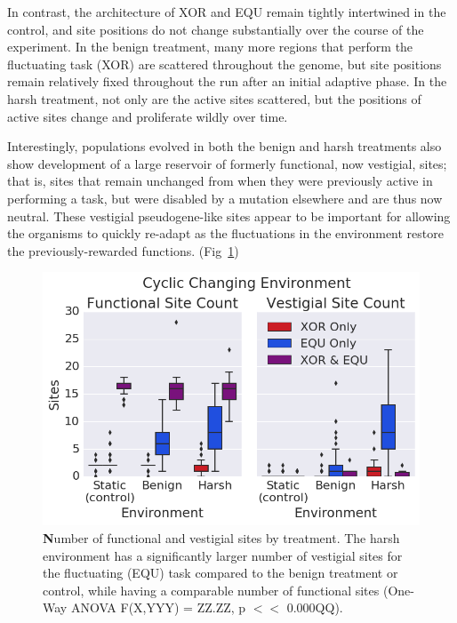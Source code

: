 \documentclass[PhD]{msu-thesis}
\begin{document}
In contrast, the architecture of XOR and EQU remain tightly intertwined in the control, and site positions do not change substantially over the course of the experiment. In the benign treatment, many more regions that perform the fluctuating task (XOR) are scattered throughout the genome, but site positions remain relatively fixed throughout the run after an initial adaptive phase. In the harsh treatment, not only are the active sites scattered, but the positions of active sites change and proliferate wildly over time.

Interestingly, populations evolved in both the benign and harsh treatments also show development of a large reservoir of formerly functional, now vestigial, sites; that is, sites that remain unchanged from when they were previously active in performing a task, but were disabled by a mutation elsewhere and are thus now neutral. These vestigial pseudogene-like sites appear to be important for allowing the organisms to quickly re-adapt as the fluctuations in the environment restore the previously-rewarded functions. (Fig~\ref{fig:CCE_func_vestigial})

\begin{figure}[!h]
\includegraphics[trim={0 0 0 0}, clip, width=0.75\columnwidth]{figures/CE/CCE_func_vest__box.png}
\caption{{\textbf Number of functional and vestigial sites by treatment}. The harsh environment has a significantly larger number of vestigial sites for the fluctuating (EQU) task compared to the benign treatment or control, while having a comparable number of functional sites (One-Way ANOVA F(X,YYY) = ZZ.ZZ, p $<<$ 0.000QQ).%
}
\label{fig:CCE_func_vestigial} %
\end{figure}
\end{document}
